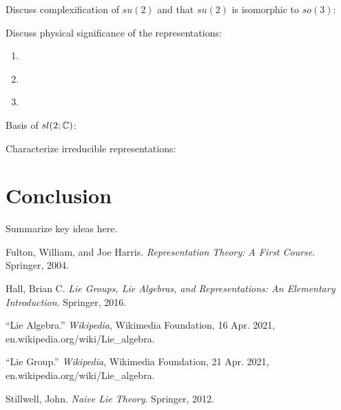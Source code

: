 \documentclass[11pt, a4paper, oneside]{article}
\theoremstyle{plain}
\theoremstyle{definition}
\theoremstyle{example}
\begin{document}
Discuss complexification of $su(2)$ and that $su(2)$ is isomorphic to $so(3)$: \cite[Section 4.6]{hall}

Discuss physical significance of the representations:
\begin{enumerate}
\item \cite[Section 4.6]{hall}

\item \cite[Section 5]{liegroupwiki}

\item \cite[Section 4.4]{liealgebrawiki}
\end{enumerate}

Basis of $sl(2; \mathbb{C})$: \cite[Section 4.6]{hall}

Characterize irreducible representations: \cite[Section 11.1]{fulton}

\newpage
\section{Conclusion}

Summarize key ideas here.

\newpage
\begin{thebibliography}{9}

Fulton, William, and Joe Harris. \textit{Representation Theory: A First Course}. Springer, 2004. 

Hall, Brian C. \textit{Lie Groups, Lie Algebras, and Representations: An Elementary Introduction}. Springer, 2016.  

“Lie Algebra.” \textit{Wikipedia}, Wikimedia Foundation, 16 Apr. 2021, \\ en.wikipedia.org/wiki/Lie\_algebra. 

“Lie Group.” \textit{Wikipedia}, Wikimedia Foundation, 21 Apr. 2021, \\ en.wikipedia.org/wiki/Lie\_algebra. 

Stillwell, John. \textit{Naive Lie Theory}. Springer, 2012. 

\end{thebibliography}
\end{document}
